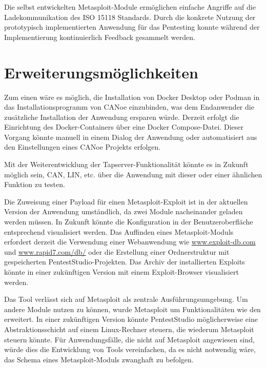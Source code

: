 Die selbst entwickelten Metasploit-Module ermöglichen einfache Angriffe auf die Ladekommunikation des ISO 15118 Standards. Durch die konkrete Nutzung der prototypisch implementierten Anwendung für das Pentesting konnte während der Implementierung kontinuierlich Feedback gesammelt werden. 

\section{Erweiterungsmöglichkeiten}\label{sec:erweiterungsmoeglichkeiten}

Zum einen wäre es möglich, die Installation von Docker Desktop oder Podman in das Installationsprogramm von CANoe einzubinden, was dem Endanwender die zusätzliche Installation der Anwendung ersparen würde. Derzeit erfolgt die Einrichtung des Docker-Containers über eine Docker Compose-Datei. Dieser Vorgang könnte manuell in einem Dialog der Anwendung oder automatisiert aus den Einstellungen eines CANoe Projekts erfolgen.

Mit der Weiterentwicklung der Tapserver-Funktionalität könnte es in Zukunft möglich sein, CAN, LIN, etc. über die Anwendung mit dieser oder einer ähnlichen Funktion zu testen.

Die Zuweisung einer Payload für einen Metasploit-Exploit ist in der aktuellen Version der Anwendung umständlich, da zwei Module nacheinander geladen werden müssen. In Zukunft könnte die Konfiguration in der Benutzeroberfläche entsprechend visualisiert werden. Das Auffinden eines Metasploit-Moduls erfordert derzeit die Verwendung einer Webanwendung wie \url{www.exploit-db.com} und \url{www.rapid7.com/db/} oder die Erstellung einer Ordnerstruktur mit gespeicherten PentestStudio-Projekten. Das Archiv der installierten Exploits könnte in einer zukünftigen Version mit einem Exploit-Browser visualisiert werden. 


Das Tool verlässt sich auf Metasploit als zentrale Ausführungsumgebung. Um andere Module nutzen zu können, wurde Metasploit um Funktionalitäten wie den  erweitert. In einer zukünftigen Version könnte PentestStudio möglicherweise eine Abstraktionsschicht auf einem Linux-Rechner steuern, die wiederum Metasploit steuern könnte. Für Anwendungsfälle, die nicht auf Metasploit angewiesen sind, würde dies die Entwicklung von Tools vereinfachen, da es nicht notwendig wäre, das Schema eines Metasploit-Moduls zwanghaft zu befolgen.

